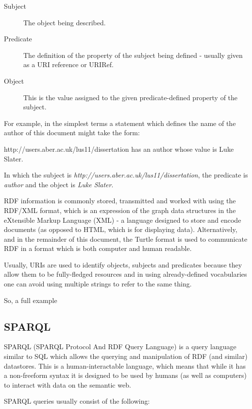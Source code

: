 \documentclass{article}
\begin{document}
\begin{description}
    \item[Subject] The object being described.
    \item[Predicate] The definition of the property of the subject being
    defined - usually given as a URI reference or URIRef.
    \item[Object] This is the value assigned to the given
    predicate-defined property of the subject.
\end{description}

For example, in the simplest terms a statement which defines the name of the author of
this document might take the form:

http://users.aber.ac.uk/lus11/dissertation has an author whose value is Luke
Slater.

In which the subject is \emph{http://users.aber.ac.uk/lus11/dissertation}, the
predicate is \emph{author} and the object is \emph{Luke Slater}.

RDF information is commonly stored, transmitted and worked with using the
RDF/XML format, which is an expression of the graph data structures in the
eXtensible Markup Language (XML) - a language designed to store and encode
documents (as opposed to HTML, which is for displaying data). Alternatively, and
in the remainder of this document, the Turtle format is used to communicate RDF
in a format which is both computer and human readable.

Usually, URIs are used to identify objects, subjects and predicates because they
allow them to be fully-fledged resources and in using already-defined
vocabularies one can avoid using multiple strings to refer to the same thing.

So, a full example

\subsection{SPARQL}

SPARQL (SPARQL Protocol And RDF Query Language) is a query language similar to
SQL which allows the querying and manipulation of RDF (and similar) datastores.
This is a human-interactable language, which means that while it has a
non-freeform syntax it is designed to be used by humans (as well as computers)
to interact with data on the semantic web.

SPARQL queries usually consist of the following:
\end{document}
